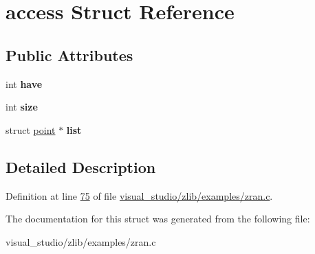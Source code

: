 \hypertarget{structaccess}{}\section{access Struct Reference}
\label{structaccess}
\subsection*{Public Attributes}
\begin{DoxyCompactItemize}
\item 
\mbox{\label{structaccess_a6068bfaf03188c5bbcaa977a792636a9}} 
int {\bfseries have}
\item 
\mbox{\label{structaccess_aea01a7415e1faa507157b9301a58a052}} 
int {\bfseries size}
\item 
\mbox{\label{structaccess_adfbe4134bb448ddd053218e7ae1cb314}} 
struct \hyperlink{structpoint}{point} $\ast$ {\bfseries list}
\end{DoxyCompactItemize}


\subsection{Detailed Description}


Definition at line \hyperlink{visual__studio_2zlib_2examples_2zran_8c_source_l00075}{75} of file \hyperlink{visual__studio_2zlib_2examples_2zran_8c_source}{visual\+\_\+studio/zlib/examples/zran.\+c}.



The documentation for this struct was generated from the following file\+:\begin{DoxyCompactItemize}
\item 
visual\+\_\+studio/zlib/examples/zran.\+c\end{DoxyCompactItemize}
